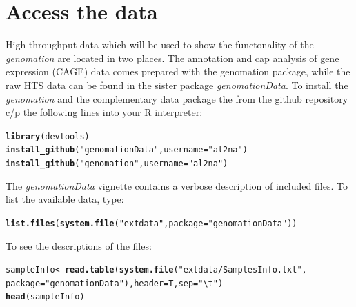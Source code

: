 \documentclass{article}\usepackage[]{graphicx}\usepackage[]{color}
\makeatletter
\newcommand{\hlstr}[1]{\textcolor[rgb]{0.192,0.494,0.8}{#1}}%
\newcommand{\hlstd}[1]{\textcolor[rgb]{0.345,0.345,0.345}{#1}}%
\newcommand{\hlkwb}[1]{\textcolor[rgb]{0.69,0.353,0.396}{#1}}%
\newcommand{\hlkwc}[1]{\textcolor[rgb]{0.333,0.667,0.333}{#1}}%
\newcommand{\hlkwd}[1]{\textcolor[rgb]{0.737,0.353,0.396}{\textbf{#1}}}%
\newenvironment{kframe}{%
 \def\at@end@of@kframe{}%
 \ifinner\ifhmode%
  \def\at@end@of@kframe{\end{minipage}}%
  \begin{minipage}{\columnwidth}%
 \fi\fi%
 \def\FrameCommand##1{\hskip\@totalleftmargin \hskip-\fboxsep
 \colorbox{shadecolor}{##1}\hskip-\fboxsep
     \hskip-\linewidth \hskip-\@totalleftmargin \hskip\columnwidth}%
 \MakeFramed {\advance\hsize-\width
   \@totalleftmargin\z@ \linewidth\hsize
   \@setminipage}}%
 {\par\unskip\endMakeFramed%
 \at@end@of@kframe}
\newenvironment{knitrout}{}{} %
\newcommand{\Rpackage}[1]{{\textit{#1}}}
\makeatother
\begin{document}
\section{Access the data}

High-throughput data which will be used to show the functonality of the 
\Rpackage{genomation} are located in two places. The annotation and cap analysis
of gene expression (CAGE) data comes prepared with the genomation package, while
the raw HTS data can be found in the sister package \Rpackage{genomationData}.
To install the \Rpackage{genomation} and the complementary data package the from
the github repository c/p the following lines into your R interpreter:
\begin{knitrout}
\color{fgcolor}\begin{kframe}
\begin{alltt}
\hlkwd{library}\hlstd{(devtools)}
\hlkwd{install_github}\hlstd{(}\hlstr{"genomationData"}\hlstd{,} \hlkwc{username} \hlstd{=} \hlstr{"al2na"}\hlstd{)}
\hlkwd{install_github}\hlstd{(}\hlstr{"genomation"}\hlstd{,} \hlkwc{username} \hlstd{=} \hlstr{"al2na"}\hlstd{)}
\end{alltt}
\end{kframe}
\end{knitrout}


The \Rpackage{genomationData} vignette contains a verbose description of 
included files. 
To list the available data, type:
\begin{knitrout}
\color{fgcolor}\begin{kframe}
\begin{alltt}
\hlkwd{list.files}\hlstd{(}\hlkwd{system.file}\hlstd{(}\hlstr{"extdata"}\hlstd{,} \hlkwc{package} \hlstd{=} \hlstr{"genomationData"}\hlstd{))}
\end{alltt}
\end{kframe}
\end{knitrout}


To see the descriptions of the files:
\begin{knitrout}
\color{fgcolor}\begin{kframe}
\begin{alltt}
\hlstd{sampleInfo} \hlkwb{<-} \hlkwd{read.table}\hlstd{(}\hlkwd{system.file}\hlstd{(}\hlstr{"extdata/SamplesInfo.txt"}\hlstd{,}
    \hlkwc{package} \hlstd{=} \hlstr{"genomationData"}\hlstd{),} \hlkwc{header} \hlstd{= T,} \hlkwc{sep} \hlstd{=} \hlstr{"\textbackslash{}t"}\hlstd{)}
\hlkwd{head}\hlstd{(sampleInfo)}
\end{alltt}
\end{kframe}
\end{knitrout}
\end{document}
